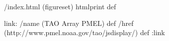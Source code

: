 /index.html {(figureset) htmlprint} def
\begin{ingrid}
link:
/name (TAO Array PMEL) def
/href (http://www.pmel.noaa.gov/tao/jsdisplay/) def
:link
\end{ingrid}